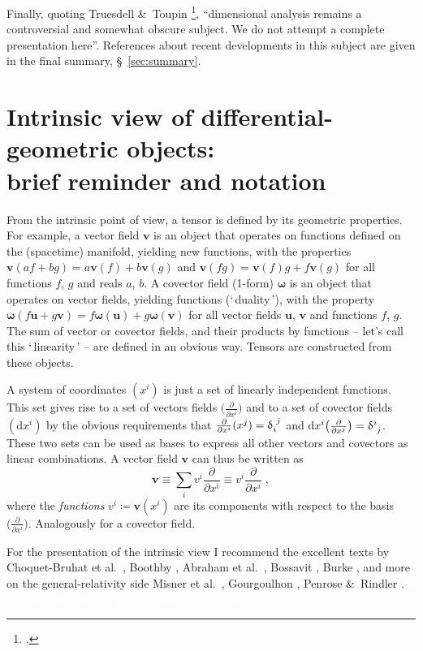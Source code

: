 \documentclass[a4paper,12pt,onecolumn,oneside,article,british]{memoir}
\newcommand*{\defquote}[1]{`\,#1\,'}
\newcommand*{\citep}{\footcites}
\newcommand*{\citey}{\parencites*}%
\newcommand*{\amp}{\&}
\newcommand*{\de}{\partial}%
\newcommand*{\delt}{\updelta}%
\newcommand*{\di}{\mathrm{d}}%
\newcommand*{\defd}{\coloneqq}
\newcommand*{\dotv}{\mathord{\,\cdot\,}}%
\newcommand*{\sect}{\S}%
\newcommand*{\chap}{ch.}%
\newcommand*{\etal}{{et al.}}
\newcommand*{\yom}{\bm{\omega}}
\newcommand*{\yv}{\bm{v}}
\newcommand*{\yu}{\bm{u}}
\renewcommand*{\i}{\indices}
\newcommand*{\dex}[1][i]{\frac{\de}{\de x^{#1}}}
\newcommand*{\dix}[1][i]{\di x^{#1}}
\begin{document}
Finally, quoting Truesdell \amp\ Toupin \citep[Appendix \sect~7
footnote~4]{truesdelletal1960}, \enquote{dimensional analysis remains a
  controversial and somewhat obscure subject. We do not attempt a complete
  presentation here}. References about recent developments in this subject
are given in the final summary, \sect~\ref{sec:summary}.



\section{Intrinsic view of differential-geometric objects:\\ brief
  reminder and notation}
\label{sec:remined}


From the intrinsic point of view, a tensor is defined by its geometric
properties. For example, a vector field $\yv$ %
is an object that operates on functions defined on the (spacetime)
manifold, yielding new functions, with the properties
$\yv(af+bg)=a\yv(f)+b\yv(g)$ and $\yv(fg)=\yv(f)g+f\yv(g)$ for all
functions $f$, $g$ and reals $a$, $b$. A covector field (1-form) $\yom$ is
an object that operates on vector fields, yielding functions
(\defquote{duality}), with the property
$\yom(f\yu+g\yv)=f\yom(\yu)+g\yom(\yv)$ for all vector fields $\yu$, $\yv$
and functions $f$, $g$. The sum of vector or covector fields, and their
products by functions -- let's call this \defquote{linearity} -- are
defined in an obvious way. Tensors are constructed from these objects.

A system of coordinates $(x^{i})$ is just a set of linearly independent
functions. This set gives rise to a set of vectors fields
$\bigl(\dex\bigr)$ and to a set of covector fields $(\dix)$ by the obvious
requirements that $\dex(x^{j})=\delt\i{_{i}^{j}}$ and
$\dix\bigl(\dex[j]\bigr)=\delt\i{^{i}_{j}}$. These two sets can be used as bases
to express all other vectors and covectors as linear combinations. A
vector field $\yv$ can thus be written as
\begin{equation}
  \label{eq:vector_intrinsic}
  \yv \equiv \sum_{i}v^{i}\dex \equiv v^{i}\dex \;,
\end{equation}
where the \emph{functions} $v^{i}\defd \yv(x^{i})$ are its components with
respect to the basis $\bigl(\dex\bigr)$. Analogously for a covector field.

\medskip

For the presentation of the intrinsic view I recommend the excellent texts
by Choquet-Bruhat \etal\ \citey{choquetbruhatetal1977_r1996}, Boothby
\citey{boothby1975_r2003}, Abraham \etal\ \citey{abrahametal1983_r1988},
Bossavit \citey{bossavit1991}, Burke
\citey{burke1985_r1987}[\chap~2]{burke1980b}, and more on the
general-relativity side Misner \etal\
\citey[\chap~9]{misneretal1970_r1973}, Gourgoulhon
\citey[\chap~2]{gourgoulhon2007_r2012}, Penrose \amp\ Rindler
\citey[\chap~4]{penroseetal1984_r2003}. \textcolor{white}{If you find this
  you can claim a postcard from me.}
\end{document}
